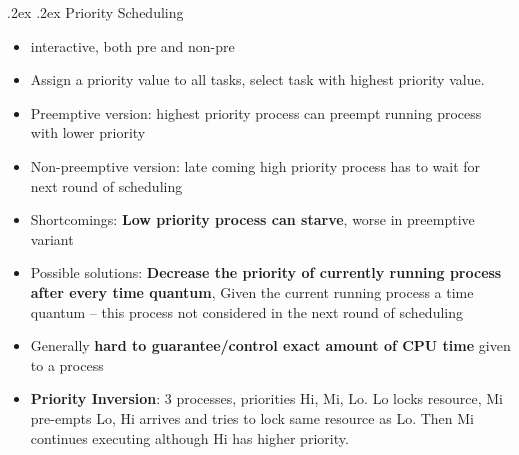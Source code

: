 \documentclass[10pt,landscape,a4paper]{article}
\makeatletter
\renewcommand{\subsubsection}{\@startsection{subsubsection}{1}{0mm}%
  {.2ex}%
  {.2ex}%
{\rmfamily\bfseries}}
\makeatother
\begin{document}
\begin{multicols*}{4}
  \subsubsection{Priority Scheduling}
  \begin{itemize}
    \item interactive, both pre and non-pre
    \item Assign a priority value to all tasks, select task with highest priority value.
    \item Preemptive version: highest priority process can preempt running process with lower priority
    \item Non-preemptive version: late coming high priority process has to wait for next round of scheduling
    \item Shortcomings: \textbf{Low priority process can starve}, worse in preemptive variant
    \item Possible solutions: \textbf{Decrease the priority of currently running process after every time quantum}, Given the current running process a time quantum -- this process not considered in the next round of scheduling
    \item Generally \textbf{hard to guarantee/control exact amount of CPU time} given to a process
    \item \textbf{Priority Inversion}: 3 processes, priorities Hi, Mi, Lo. Lo locks resource, Mi pre-empts Lo, Hi arrives and tries to lock same resource as Lo. Then Mi continues executing although Hi has higher priority.
  \end{itemize}

\end{multicols*}
\end{document}
